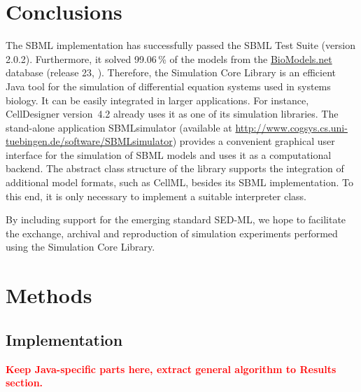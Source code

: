 \documentclass[10pt]{bmc_article}
\newenvironment{bmcformat}{\baselineskip20pt\sloppy\setboolean{publ}{false}}{\baselineskip20pt\sloppy}
\newcommand{\TODO}[1]{\textcolor{red}{\textbf{#1}}}
\begin{document}
\begin{bmcformat}
\section{Conclusions}
The SBML implementation has successfully passed the
SBML Test Suite (version 2.0.2).
Furthermore, it solved 99.06\,\% of the models from the
\href{http://biomodels.net}{BioModels.net} database (release 23,
\cite{Novere2006a}).
Therefore, the Simulation Core Library is an efficient Java tool for the
simulation of differential equation systems used in systems biology. It can be
easily integrated in larger applications. For instance,
CellDesigner version~4.2 \cite{Funahashi2003} already uses it as one of its simulation libraries.
The stand-alone application SBMLsimulator (available at
\href{http://www.cogsys.cs.uni-tuebingen.de/software/SBMLsimulator}{http://www.cogsys.cs.uni-tuebingen.de/software/SBMLsimulator})
provides a convenient graphical user interface for the simulation of SBML
models and uses it as a computational backend.
The abstract class structure of the library supports the integration of
additional model formats, such as CellML, besides its SBML implementation. To
this end, it is only necessary to implement a suitable interpreter class.


By including support for the emerging standard SED-ML, we hope to facilitate the
exchange, archival and reproduction of simulation experiments performed using
the Simulation Core Library.

\section{Methods}

\subsection{Implementation}

\TODO{Keep Java-specific parts here, extract general algorithm to Results
section.}


\end{bmcformat}
\end{document}
